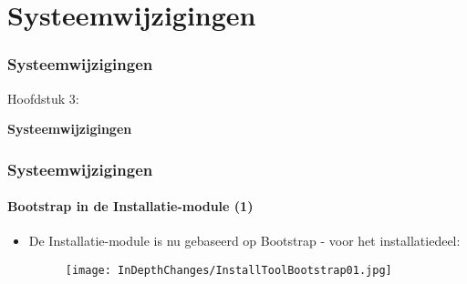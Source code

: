 %

\section{Systeemwijzigingen}
\begin{frame}[fragile]
	\frametitle{Systeemwijzigingen}

	\begin{center}\huge{Hoofdstuk 3:}\end{center}
	\begin{center}\huge{\color{typo3darkgrey}\textbf{Systeemwijzigingen}}\end{center}

\end{frame}


\begin{frame}[fragile]
	\frametitle{Systeemwijzigingen}
	\framesubtitle{Bootstrap in de Installatie-module (1)}

	\begin{itemize}

		\item De Installatie-module is nu gebaseerd op Bootstrap - voor het installatiedeel:

			\begin{figure}
				\texttt{[image: InDepthChanges/InstallToolBootstrap01.jpg]}
			\end{figure}

	\end{itemize}

\end{frame}

